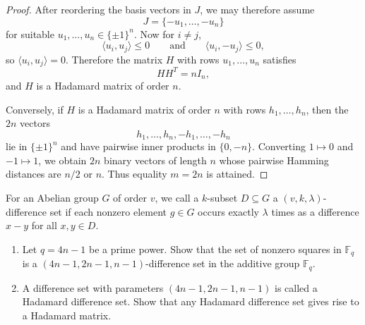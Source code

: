 \documentclass[11pt, a4paper]{ctexrep}
\begin{document}
\begin{proof}
    After reordering the basis vectors in \(J\), we may therefore assume
    \[
        J=\{-u_1,\dots,-u_n\}
    \]
    for suitable \(u_1,\dots,u_n\in\{\pm1\}^n\). Now for \(i\ne j\),
    \[
        \langle u_i,u_j\rangle\le 0
        \qquad\text{and}\qquad
        \langle u_i,-u_j\rangle\le 0,
    \]
    so \(\langle u_i,u_j\rangle=0\). Therefore the matrix \(H\) with rows \(u_1,\dots,u_n\) satisfies
    \[
        HH^T=nI_n,
    \]
    and \(H\) is a Hadamard matrix of order \(n\).

    Conversely, if \(H\) is a Hadamard matrix of order \(n\) with rows \(h_1,\dots,h_n\), then the
    \(2n\) vectors
    \[
        h_1,\dots,h_n,-h_1,\dots,-h_n
    \]
    lie in \(\{\pm1\}^n\) and have pairwise inner products in \(\{0,-n\}\). Converting \(1\mapsto 0\) and
    \(-1\mapsto 1\), we obtain \(2n\) binary vectors of length \(n\) whose pairwise Hamming distances are
    \(n/2\) or \(n\). Thus equality \(m=2n\) is attained.
\end{proof}

\begin{exercise}
    For an Abelian group $G$ of order $v$, we call a $k$-subset $D\subseteq G$ a $(v,k,\lambda)$-difference
    set if each nonzero element $g\in G$ occurs exactly $\lambda$ times as a difference $x-y$ for
    all $x,y\in D$.
    \begin{enumerate}
        \item[(a)] Let $q=4n-1$ be a prime power. Show that the set of nonzero squares in $\mathbb{F}_q$
              is a $(4n-1,2n-1,n-1)$-difference set in the additive group $\mathbb{F}_q$.
        \item[(b)] A difference set with parameters $(4n-1,2n-1,n-1)$ is called a Hadamard
              difference set. Show that any Hadamard difference set gives rise to a Hadamard
              matrix.
    \end{enumerate}
\end{exercise}
\end{document}
